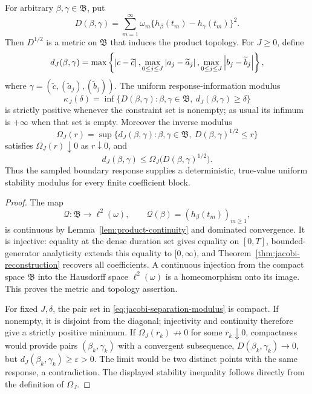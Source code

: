 \begin{proposition}
\label{prop:jacobi-response-geometry}
For arbitrary \(\beta,\gamma\in\mathfrak B\), put
\begin{equation}
 D(\beta,\gamma)=\sum_{m=1}^{\infty}\omega_m
 \{h_\beta(t_m)-h_\gamma(t_m)\}^2.
 \label{eq:two-point-response-metric}
\end{equation}
Then \(D^{1/2}\) is a metric on \(\mathfrak B\) that induces the product
topology.  For \(J\ge0\), define
\[
 d_J(\beta,\gamma)=\max\left\{\left|c-\widetilde c\right|,
 \max_{0\le j\le J}\left|a_j-\widetilde a_j\right|,
 \max_{0\le j\le J}\left|b_j-\widetilde b_j\right|\right\},
\]
where \(\gamma=(\widetilde c,(\widetilde a_j),(\widetilde b_j))\).  The
uniform response-information modulus
\begin{equation}
 \kappa_J(\delta)=
 \inf\{D(\beta,\gamma):\beta,\gamma\in\mathfrak B,
                         \ d_J(\beta,\gamma)\ge\delta\}
 \label{eq:jacobi-separation-modulus}
\end{equation}
is strictly positive whenever the constraint set is nonempty; as usual its
infimum is \(+\infty\) when that set is empty.  Moreover the inverse modulus
\begin{equation}
 \Omega_J(r)=\sup\{d_J(\beta,\gamma):\beta,\gamma\in\mathfrak B,
                         \ D(\beta,\gamma)^{1/2}\le r\}
 \label{eq:jacobi-inverse-modulus}
\end{equation}
satisfies \(\Omega_J(r)\downarrow0\) as \(r\downarrow0\), and
\[
 d_J(\beta,\gamma)\le
 \Omega_J\bigl(D(\beta,\gamma)^{1/2}\bigr).
\]
Thus the sampled boundary response supplies a deterministic, true-value
uniform stability modulus for every finite coefficient block.
\end{proposition}

\begin{proof}
The map
\[
 \mathcal Q:\mathfrak B\longrightarrow\ell^2(\omega),\qquad
 \mathcal Q(\beta)=(h_\beta(t_m))_{m\ge1},
\]
is continuous by Lemma~\ref{lem:product-continuity} and dominated
convergence.  It is injective: equality at the dense duration set gives
equality on \([0,T]\), bounded-generator analyticity extends this equality
to \([0,\infty)\), and Theorem~\ref{thm:jacobi-reconstruction} recovers all
coefficients.  A continuous injection from the compact space
\(\mathfrak B\) into the Hausdorff space \(\ell^2(\omega)\) is a
homeomorphism onto its image.  This proves the metric and topology assertion.

For fixed \(J,\delta\), the pair set in
\eqref{eq:jacobi-separation-modulus} is compact.  If nonempty, it is disjoint
from the diagonal; injectivity and continuity therefore give a strictly
positive minimum.  If \(\Omega_J(r_k)\not\to0\) for some \(r_k\downarrow0\),
compactness would provide pairs \((\beta_k,\gamma_k)\) with a convergent
subsequence, \(D(\beta_k,\gamma_k)\to0\), but
\(d_J(\beta_k,\gamma_k)\ge\varepsilon>0\).  The limit would be two distinct
points with the same response, a contradiction.  The displayed stability
inequality follows directly from the definition of \(\Omega_J\).
\end{proof}


